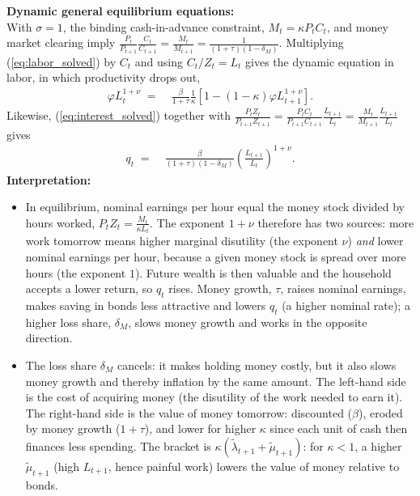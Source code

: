 \documentclass[a4paper, 12pt]{article}
\begin{document}
\begin{Answer}%
	\textbf{Dynamic general equilibrium equations:}\\%
	With $\sigma = 1$, the binding cash-in-advance constraint, $M_t = \kappa P_t C_t$, and money market clearing imply $\frac{P_t}{P_{t+1}}\frac{C_t}{C_{t+1}} = \frac{M_t}{M_{t+1}} = \frac{1}{(1+\tau)(1-\delta_M)}$. Multiplying (\ref{eq:labor_solved}) by $C_t$ and using $C_t/Z_t = L_t$ gives the dynamic equation in labor, in which productivity drops out,%
	\begin{align}%
		\varphi L_t^{1+\nu} \; = & \; \frac{\beta}{1+\tau} \frac{1}{\kappa} \left[ 1 - \left(1-\kappa\right) \varphi L_{t+1}^{1+\nu} \right].\label{eq:dyn_labor}%
	\end{align}%
	Likewise, (\ref{eq:interest_solved}) together with $\frac{P_t Z_t}{P_{t+1}Z_{t+1}} = \frac{P_tC_t}{P_{t+1}C_{t+1}} \frac{L_{t+1}}{L_t} = \frac{M_t}{M_{t+1}}\frac{L_{t+1}}{L_t}$ gives%
	\begin{align}%
		q_t \; = & \; \frac{\beta}{\left(1+\tau\right)\left(1-\delta_M\right)} \left(\frac{L_{t+1}}{L_t}\right)^{1+\nu}.\label{eq:dyn_q}%
	\end{align}%
	\textbf{Interpretation:}%
	\begin{itemize}%
		\item[(\ref{eq:dyn_q})] In equilibrium, nominal earnings per hour equal the money stock divided by hours worked, $P_tZ_t = \frac{M_t}{\kappa L_t}$. The exponent $1+\nu$ therefore has two sources: more work tomorrow means higher marginal disutility (the exponent $\nu$) \emph{and} lower nominal earnings per hour, because a given money stock is spread over more hours (the exponent $1$). Future wealth is then valuable and the household accepts a lower return, so $q_t$ rises. Money growth, $\tau$, raises nominal earnings, makes saving in bonds less attractive and lowers $q_t$ (a higher nominal rate); a higher loss share, $\delta_M$, slows money growth and works in the opposite direction.%
		\item[(\ref{eq:dyn_labor})] The loss share $\delta_M$ cancels: it makes holding money costly, but it also slows money growth and thereby inflation by the same amount. The left-hand side is the cost of acquiring money (the disutility of the work needed to earn it). The right-hand side is the value of money tomorrow: discounted ($\beta$), eroded by money growth ($1+\tau$), and lower for higher $\kappa$ since each unit of cash then finances less spending. The bracket is $\kappa(\tilde\lambda_{t+1}+\tilde\mu_{t+1})$: for $\kappa<1$, a higher $\tilde\mu_{t+1}$ (high $L_{t+1}$, hence painful work) lowers the value of money relative to bonds.%

\end{itemize}
\end{Answer}
\end{document}
